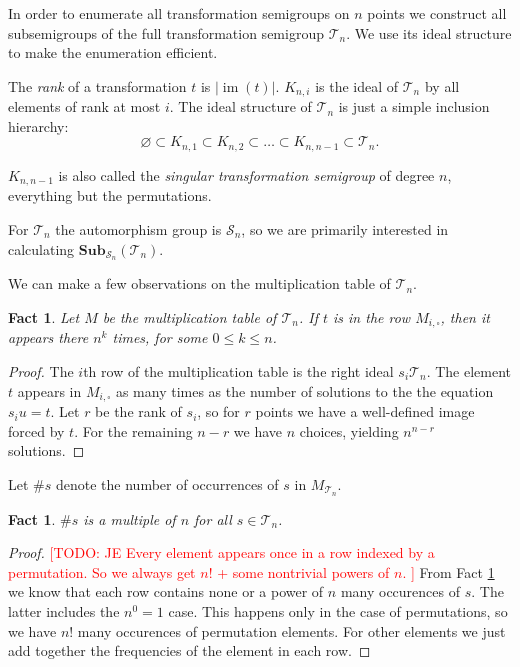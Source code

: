 \documentclass{amsart}
\newcommand{\cT}{{\mathcal T}}
\newcommand{\cS}{{\mathcal S}}
\newcommand{\Sub}{\mathbf{Sub}}
\DeclareMathOperator{\im}{im}
\newcommand{\todo}[1]{\textcolor{red}{ \small \textsf{[TODO:  #1 ]} \normalsize}}
\theoremstyle{plain}
\newtheorem{fact}[theorem]{Fact}
\theoremstyle{definition}
\begin{document}
In order to enumerate all transformation semigroups on $n$ points we construct all subsemigroups of the full transformation semigroup $\cT_n$. We use its ideal structure to make the enumeration efficient.

The \emph{rank} of a transformation $t$ is $|\im(t)|$. 
$K_{n,i}$ is the ideal of $\cT_n$ by all elements of rank at most $i$.
The ideal structure of $\cT_n$ is just a simple inclusion hierarchy:
$$\varnothing\subset K_{n,1}\subset K_{n,2}\subset\ldots\subset K_{n,n-1}\subset \cT_n.$$

$K_{n,n-1}$ is also called the \emph{singular transformation semigroup} of degree $n$, everything but the permutations.

 For $\cT_n$ the automorphism group is $\cS_n$, so we are primarily interested in calculating $\Sub_{\cS_n}(\cT_n)$.

We can make a few observations on the multiplication table of $\cT_n$.
\begin{fact}
\label{fact:npower}
Let $M$ be the multiplication table of $\cT_n$.
If $t$ is in the row $M_{i,\square}$, then it appears there $n^k$ times, for some $0\leq k\leq n$.
\end{fact}
\begin{proof}
The $i$th row of the multiplication table is the right  ideal $s_i\cT_n$.
The element $t$ appears in $M_{i,\square}$ as many times as the number of solutions to the the equation $s_iu=t$.
Let $r$ be the rank of $s_i$, so for $r$ points we have a well-defined image forced by $t$.
For the remaining $n-r$ we have $n$ choices, yielding $n^{n-r}$ solutions. 
\end{proof}

Let $\#s$ denote the number of occurrences of $s$ in $M_{\cT_n}$.
\begin{fact}
$\#s$ is a multiple of $n$ for all $s\in\cT_n$.
\end{fact}
\begin{proof}
\todo{JE Every element appears once in a row indexed by a permutation. So we always get $n!$ + some nontrivial powers of $n$.}
From Fact \ref{fact:npower} we know that each row contains none or a power of $n$ many occurences of $s$.
The latter includes the $n^0=1$ case.
This happens only in the case of permutations, so we have $n!$ many occurences of permutation elements.
For other elements we just add together the frequencies of the element in each row.
\end{proof}
\end{document}
